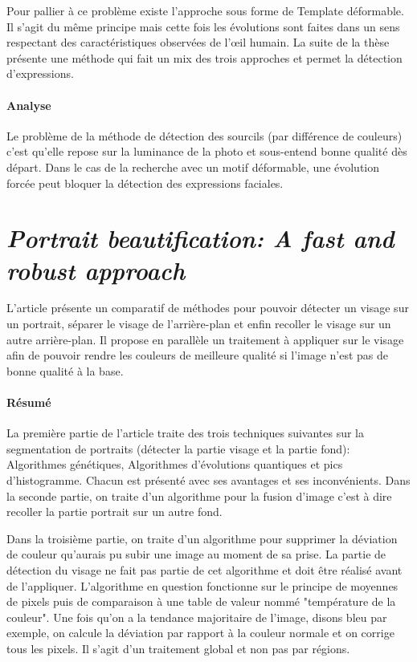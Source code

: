 \documentclass[11pt, french]{report-rd-info}
\begin{document}
Pour pallier à ce problème existe l'approche sous forme de Template déformable. Il s'agit du même principe mais cette fois les évolutions sont faites dans un sens respectant des caractéristiques observées de l'œil humain. La suite de la thèse présente une méthode qui fait un mix des trois approches et permet la détection d'expressions.

\paragraph{Analyse}
Le problème de la méthode de détection des sourcils (par différence de couleurs) c’est qu’elle repose sur la luminance de la photo et sous-entend bonne qualité dès départ.
Dans le cas de la recherche avec un motif déformable, une évolution forcée peut bloquer la détection des expressions faciales.

\section{\emph{Portrait beautification: A fast and robust approach}}
L'article \cite{Liu2007} présente un comparatif de méthodes pour pouvoir détecter un visage sur un portrait, séparer le visage de l'arrière-plan et enfin recoller le visage sur un autre arrière-plan. Il propose en parallèle un traitement à appliquer sur le visage afin de pouvoir rendre les couleurs de meilleure qualité si l'image n'est pas de bonne qualité à la base.

\paragraph{Résumé}
La première partie de l'article traite des trois techniques suivantes sur la segmentation de portraits (détecter la partie visage et la partie fond): Algorithmes génétiques, Algorithmes d'évolutions quantiques et pics d'histogramme. Chacun est présenté avec ses avantages et ses inconvénients.
Dans la seconde partie, on traite d'un algorithme pour la fusion d'image c'est à dire recoller la partie portrait sur un autre fond.

Dans la troisième partie, on traite d'un algorithme pour supprimer la déviation de couleur qu'aurais pu subir une image au moment de sa prise. La partie de détection du visage ne fait pas partie de cet algorithme et doit être réalisé avant de l'appliquer. L'algorithme en question fonctionne sur le principe de moyennes de pixels puis de comparaison à une table de valeur nommé "température de la couleur". Une fois qu'on a la tendance majoritaire de l'image, disons bleu par exemple, on calcule la déviation par rapport à la couleur normale et on corrige tous les pixels. Il s'agit d'un traitement global et non pas par régions.
\end{document}
